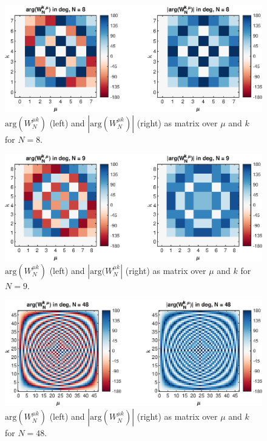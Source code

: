 \documentclass[11pt,a4paper,DIV=12]{scrartcl}
\begin{document}
\begin{figure}[t]
		\centering
		\includegraphics[]{graphics/TwiddleFactorMatrix_N8}
		\caption{$\text{arg}(W_N^{\mu k})$ (left) and $|\text{arg}(W_N^{\mu k})|$
		(right) as matrix over $\mu$ and $k$ for $N=8$.}
		\label{Twiddle1}
\end{figure}
\begin{figure}[t]
		\centering
		\includegraphics[]{graphics/TwiddleFactorMatrix_N9}
		\caption{$\text{arg}(W_N^{\mu k})$ (left) and $|\text{arg}(W_N^{\mu k}|$
		(right) as matrix over $\mu$ and $k$ for $N=9$.}
		\label{Twiddle2}
\end{figure}
\begin{figure}
		\centering
		\includegraphics[]{graphics/TwiddleFactorMatrix_N48}
		\caption{$\text{arg}(W_N^{\mu k})$ (left) and $|\text{arg}(W_N^{\mu k})|$
		(right) as matrix over $\mu$ and $k$ for $N=48$.}
		\label{Twiddle3}
\end{figure}
\end{document}
